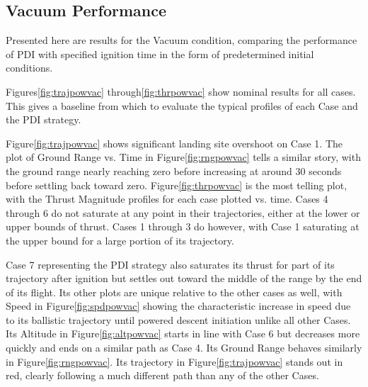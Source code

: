 \subsection{Vacuum Performance} \label{sec:vacperf}

Presented here are results for the Vacuum condition, comparing the performance of PDI with specified ignition time in the form of predetermined initial conditions.

Figures\:\ref{fig:trajpowvac} through\:\ref{fig:thrpowvac} show nominal results for all cases. This gives a baseline from which to evaluate the typical profiles of each Case and the PDI strategy. 

Figure\:\ref{fig:trajpowvac} shows significant landing site overshoot on Case 1. The plot of Ground Range vs. Time in Figure\:\ref{fig:rngpowvac} tells a similar story, with the ground range nearly reaching zero before increasing at around 30 seconds before settling back toward zero. Figure\:\ref{fig:thrpowvac} is the most telling plot, with the Thrust Magnitude profiles for each case plotted vs. time. Cases 4 through 6 do not saturate at any point in their trajectories, either at the lower or upper bounds of thrust. Cases 1 through 3 do however, with Case 1 saturating at the upper bound for a large portion of its trajectory. 

Case 7 representing the PDI strategy also saturates its thrust for part of its trajectory after ignition but settles out toward the middle of the range by the end of its flight. Its other plots are unique relative to the other cases as well, with Speed in Figure\:\ref{fig:spdpowvac} showing the characteristic increase in speed due to its ballistic trajectory until powered descent initiation unlike all other Cases. Its Altitude in Figure\:\ref{fig:altpowvac} starts in line with Case 6 but decreases more quickly and ends on a similar path as Case 4. Its Ground Range behaves similarly in Figure\:\ref{fig:rngpowvac}. Its trajectory in Figure\:\ref{fig:trajpowvac} stands out in red, clearly following a much different path than any of the other Cases.

